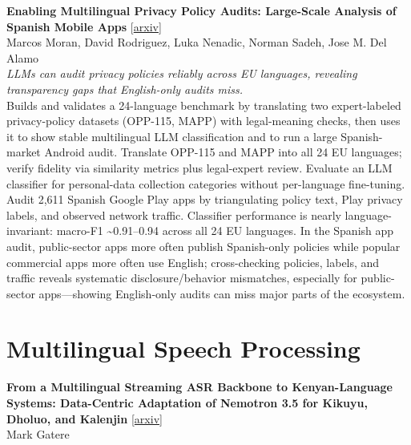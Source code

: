 \documentclass[12pt,letterpaper]{article}
\begin{document}
\medskip

{\small\textbf{Enabling Multilingual Privacy Policy Audits: Large-Scale Analysis of Spanish Mobile Apps}} {\scriptsize[\href{https://arxiv.org/abs/2607.18424}{arxiv}]}\\
{\scriptsize Marcos Moran, David Rodriguez, Luka Nenadic, Norman Sadeh, Jose M. Del Alamo}\\

{\small\textit{LLMs can audit privacy policies reliably across EU languages, revealing transparency gaps that English-only audits miss.}}\\[1pt]
{\footnotesize Builds and validates a 24-language benchmark by translating two expert-labeled privacy-policy datasets (OPP-115, MAPP) with legal-meaning checks, then uses it to show stable multilingual LLM classification and to run a large Spanish-market Android audit. Translate OPP-115 and MAPP into all 24 EU languages; verify fidelity via similarity metrics plus legal-expert review. Evaluate an LLM classifier for personal-data collection categories without per-language fine-tuning. Audit 2,611 Spanish Google Play apps by triangulating policy text, Play privacy labels, and observed network traffic. Classifier performance is nearly language-invariant: macro-F1 \textasciitilde{}0.91--0.94 across all 24 EU languages. In the Spanish app audit, public-sector apps more often publish Spanish-only policies while popular commercial apps more often use English; cross-checking policies, labels, and traffic reveals systematic disclosure/behavior mismatches, especially for public-sector apps---showing English-only audits can miss major parts of the ecosystem.}

\medskip


\section*{Multilingual Speech Processing}

{\small\textbf{From a Multilingual Streaming ASR Backbone to Kenyan-Language Systems: Data-Centric Adaptation of Nemotron 3.5 for Kikuyu, Dholuo, and Kalenjin}} {\scriptsize[\href{https://arxiv.org/abs/2607.18912}{arxiv}]}\\
{\scriptsize Mark Gatere}\\
\end{document}
